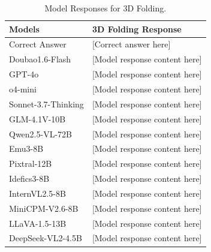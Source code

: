 \begin{table}[h]
\setlength{\tabcolsep}{3mm}
\centering
\small
\begin{tabular}{l|p{12cm}}
\toprule
\textbf{Models} & \textbf{3D Folding Response} \\
\midrule
Correct Answer & [Correct answer here]\\
\midrule
Doubao1.6-Flash & [Model response content here] \\
\midrule
GPT-4o & [Model response content here] \\
\midrule
o4-mini & [Model response content here] \\
\midrule
Sonnet-3.7-Thinking & [Model response content here] \\
\midrule
GLM-4.1V-10B & [Model response content here] \\
\midrule
Qwen2.5-VL-72B & [Model response content here] \\
Emu3-8B & [Model response content here] \\
Pixtral-12B & [Model response content here] \\
Idefics3-8B & [Model response content here] \\
InternVL2.5-8B & [Model response content here] \\
MiniCPM-V2.6-8B & [Model response content here] \\
LLaVA-1.5-13B & [Model response content here] \\
DeepSeek-VL2-4.5B & [Model response content here] \\
\bottomrule
\end{tabular}
\begin{center}
\caption{Model Responses for 3D Folding.}
\end{center}
\label{tab:task4_responses}
\end{table}

